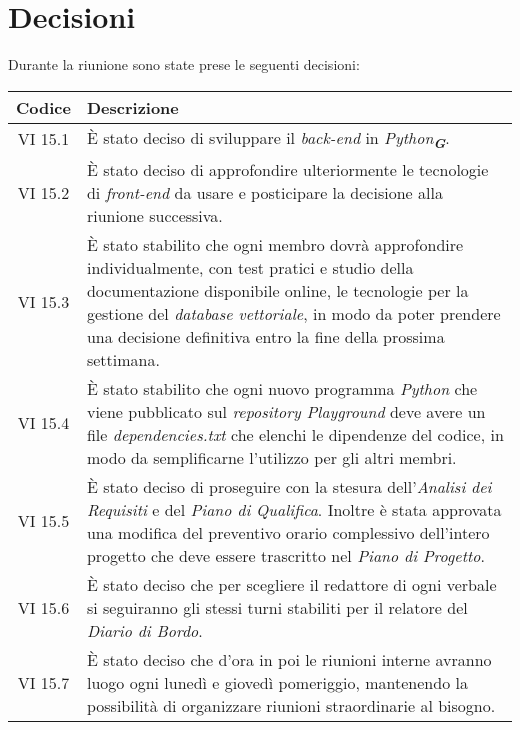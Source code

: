 
\section{Decisioni}

Durante la riunione sono state prese le seguenti decisioni:

\vspace{0.5cm}

\begin{table}[htbp]
    \centering
    \begin{tabular}{|c|p{}|}
        \hline
        \rowcolor[gray]{0.75}
        \textbf{Codice} & \textbf{Descrizione}\\
        \hline
        VI 15.1 & È stato deciso di sviluppare il \emph{back-end} in \emph{Python}\textsubscript{\textit{\textbf{G}}}. \\
        \hline
        VI 15.2 & È stato deciso di approfondire ulteriormente le tecnologie di \emph{front-end} da usare e posticipare la decisione alla riunione successiva. \\
        \hline
        VI 15.3 & È stato stabilito che ogni membro dovrà approfondire individualmente, con test pratici e studio della documentazione disponibile online,
        le tecnologie per la gestione del \emph{database vettoriale}, in modo da poter prendere una decisione definitiva entro la fine della prossima settimana. \\
        \hline
        VI 15.4 & È stato stabilito che ogni nuovo programma \emph{Python} che viene pubblicato sul \emph{repository Playground} deve avere un file \emph{dependencies.txt}
        che elenchi le dipendenze del codice, in modo da semplificarne l'utilizzo per gli altri membri. \\
        \hline
        VI 15.5 & È stato deciso di proseguire con la stesura dell'\emph{Analisi dei Requisiti} e del \emph{Piano di Qualifica}. Inoltre è stata approvata una modifica del preventivo orario complessivo dell'intero progetto che deve essere trascritto nel \emph{Piano di Progetto}. \\
        \hline
        VI 15.6 & È stato deciso che per scegliere il redattore di ogni verbale si seguiranno gli stessi turni stabiliti per il relatore del \emph{Diario di Bordo}. \\
        \hline
        VI 15.7 & È stato deciso che d'ora in poi le riunioni interne avranno luogo ogni lunedì e giovedì pomeriggio, mantenendo la possibilità di organizzare riunioni straordinarie al bisogno. \\
        \hline
    \end{tabular}
\end{table}